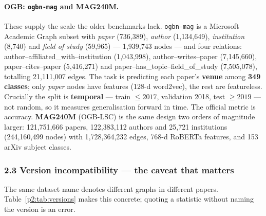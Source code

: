 \paragraph{OGB: \texttt{ogbn-mag} and MAG240M.} These supply the scale the older benchmarks lack.
\texttt{ogbn-mag} is a Microsoft Academic Graph subset with \emph{paper} (736{,}389),
\emph{author} (1{,}134{,}649), \emph{institution} (8{,}740) and \emph{field of study} (59{,}965)
--- 1{,}939{,}743 nodes --- and four relations: author--affiliated\_with--institution
(1{,}043{,}998), author--writes--paper (7{,}145{,}660), paper--cites--paper (5{,}416{,}271) and
paper--has\_topic--field\_of\_study (7{,}505{,}078), totalling 21{,}111{,}007 edges. The task is
predicting each paper's \textbf{venue} among \textbf{349 classes}; only \emph{paper} nodes have
features (128-d word2vec), the rest are featureless. Crucially the split is \textbf{temporal}
--- train $\le 2017$, validation 2018, test $\ge 2019$ --- not random, so it measures
generalisation forward in time. The official metric is accuracy. \textbf{MAG240M} (OGB-LSC) is the
same design two orders of magnitude larger: 121{,}751{,}666 papers, 122{,}383{,}112 authors and
25{,}721 institutions (244{,}160{,}499 nodes) with 1{,}728{,}364{,}232 edges, 768-d RoBERTa
features, and 153 arXiv subject classes.

\subsubsection*{2.3 Version incompatibility --- the caveat that matters}

The same dataset name denotes different graphs in different papers. Table~\ref{p2:tab:versions}
makes this concrete; quoting a statistic without naming the version is an error.

